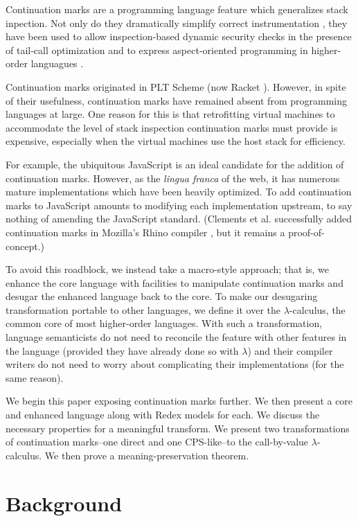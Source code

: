 \documentclass{llncs}
\newcommand{\lc}[0]{$\lambda$-calculus}
\begin{document}
Continuation marks \cite{clements2006portable} are a programming language feature which generalizes stack inpection. Not only do they dramatically simplify correct instrumentation \cite{clements2001modeling}, they have been used to allow inspection-based dynamic security checks in the presence of tail-call optimization \cite{clements2004tail} and to express aspect-oriented programming in higher-order languagues \cite{tucker2003pointcuts}.

Continuation marks originated in PLT Scheme (now Racket \cite{plt-tr1}). However, in spite of their usefulness, continuation marks have remained absent from programming languages at large. One reason for this is that retrofitting virtual machines to accommodate the level of stack inspection continuation marks must provide is expensive, especially when the virtual machines use the host stack for efficiency.

For example, the ubiquitous JavaScript is an ideal candidate for the addition of continuation marks. However, as the \emph{lingua franca} of the web, it has numerous mature implementations which have been heavily optimized. To add continuation marks to JavaScript amounts to modifying each implementation upstream, to say nothing of amending the JavaScript standard. (Clements et al. successfully added continuation marks in Mozilla's Rhino compiler \cite{clements2008implementing}, but it remains a proof-of-concept.)

To avoid this roadblock, we instead take a macro-style approach; that is, we enhance the core language with facilities to manipulate continuation marks and desugar the enhanced language back to the core. To make our desugaring transformation portable to other languages, we define it over the \lc, the common core of most higher-order languages. With such a transformation, language semanticists do not need to reconcile the feature with other features in the language (provided they have already done so with $\lambda$) and their compiler writers do not need to worry about complicating their implementations (for the same reason).

We begin this paper exposing continuation marks further. We then present a core and enhanced language along with Redex models for each. We discuss the necessary properties for a meaningful transform.  We present two transformations of continuation marks--one direct and one CPS-like--to the call-by-value \lc. We then prove a meaning-preservation theorem.

\section{Background}
\end{document}
